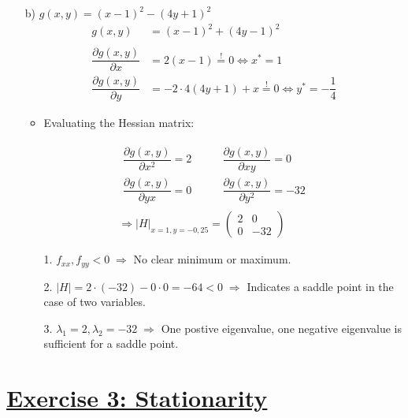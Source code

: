\documentclass[12pt,a4paper]{article}
\newcommand{\tmpsection}[1]{}
\let\tmpsection=\section
\renewcommand{\section}[1]{\tmpsection{\underline{#1}} }
\begin{document}
\begin{itemize}
\begin{itemize}
    \end{itemize}
    \item[b)] $g(x,y) = (x -1)^2 - (4y + 1)^2$
    \begin{align*}
      g(x,y) & = (x -1)^2 + (4y - 1)^2\\
      & \\
      \dfrac{\partial g(x,y)}{\partial x} & = 2(x - 1) \overset{!}{=} 0 \Leftrightarrow x^{*} = 1 \\
      \dfrac{\partial g(x,y)}{\partial y} & = - 2 \cdot 4 (4y + 1) + x \overset{!}{=} 0 \Leftrightarrow y^{*} = - \dfrac{1}{4} 
    \end{align*}
    \begin{itemize}
      \item Evaluating the Hessian matrix:
    \end{itemize}
    \begin{align*}
        \begin{matrix}
      \dfrac{\partial g(x,y)}{\partial x^2} = 2 \qquad  & \dfrac{\partial g(x,y)}{\partial xy} = 0 \\
      \dfrac{\partial g(x,y)}{\partial yx} = 0  \qquad  & \dfrac{\partial g(x,y)}{\partial y^2} = -32
      \end{matrix}\\
      \Rightarrow \left| H \right|_{x = 1, y = - 0,25} = 
      \begin{pmatrix}
        2 & 0 \\
        0 & -32
      \end{pmatrix}
    \end{align*}
    \begin{itemize}
      \item[1.] $f_{xx}, f_{yy} < 0 \; \Rightarrow$ No clear minimum or maximum.
      \item[2.] $|H| = 2 \cdot (-32) - 0 \cdot 0 = - 64 < 0 \; \Rightarrow$ Indicates a saddle point in the case of two variables.
      \item[3.] $\lambda_1 = 2, \lambda_2 = -32 \; \Rightarrow$ One postive eigenvalue, one negative eigenvalue is sufficient for a saddle point.  
    \end{itemize}
\end{itemize}

\hypertarget{exercise-3-stationarity}{%
\section{Exercise 3: Stationarity}\label{exercise-3-stationarity}}
\end{document}
